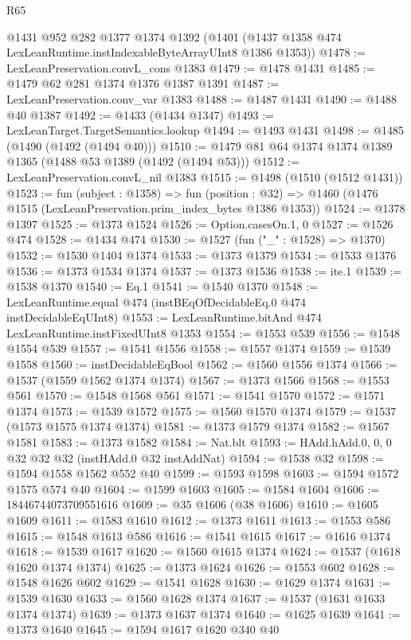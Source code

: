 \begin{lexlean}{R65}
\begin{coremodule}
    @1431
    @952
    @282
    @1377
    @1374
    @1392
    (@1401 (@1437 @1358 @474 LexLeanRuntime.instIndexableByteArrayUInt8 @1386 @1353))
@1478 := LexLeanPreservation.convL_cons @1383
@1479 := @1478 @1431
@1485 := @1479 @62 @281 @1374 @1376 @1387 @1391
@1487 := LexLeanPreservation.conv_var @1383
@1488 := @1487 @1431
@1490 := @1488 @40 @1387
@1492 := @1433 (@1434 @1347)
@1493 := LexLeanTarget.TargetSemantics.lookup
@1494 := @1493 @1431
@1498 := @1485 (@1490 (@1492 (@1494 @40)))
@1510 := @1479 @81 @64 @1374 @1374 @1389 @1365 (@1488 @53 @1389 (@1492 (@1494 @53)))
@1512 := LexLeanPreservation.convL_nil @1383
@1515 := @1498 (@1510 (@1512 @1431))
@1523 := fun (subject : @1358) =>
  fun (position : @32) => @1460 (@1476 @1515 (LexLeanPreservation.prim_index_bytes @1386 @1353))
@1524 := @1378 @1397
@1525 := @1373 @1524
@1526 := Option.casesOn.{1, 0}
@1527 := @1526 @474
@1528 := @1434 @474
@1530 := @1527 (fun ("_" : @1528) => @1370)
@1532 := @1530 @1404 @1374
@1533 := @1373 @1379
@1534 := @1533 @1376
@1536 := @1373 @1534 @1374
@1537 := @1373 @1536
@1538 := ite.{1}
@1539 := @1538 @1370
@1540 := Eq.{1}
@1541 := @1540 @1370
@1548 := LexLeanRuntime.equal @474 (instBEqOfDecidableEq.{0} @474 instDecidableEqUInt8)
@1553 := LexLeanRuntime.bitAnd @474 LexLeanRuntime.instFixedUInt8 @1353
@1554 := @1553 @539
@1556 := @1548 @1554 @539
@1557 := @1541 @1556
@1558 := @1557 @1374
@1559 := @1539 @1558
@1560 := instDecidableEqBool
@1562 := @1560 @1556 @1374
@1566 := @1537 (@1559 @1562 @1374 @1374)
@1567 := @1373 @1566
@1568 := @1553 @561
@1570 := @1548 @1568 @561
@1571 := @1541 @1570
@1572 := @1571 @1374
@1573 := @1539 @1572
@1575 := @1560 @1570 @1374
@1579 := @1537 (@1573 @1575 @1374 @1374)
@1581 := @1373 @1579 @1374
@1582 := @1567 @1581
@1583 := @1373 @1582
@1584 := Nat.blt
@1593 := HAdd.hAdd.{0, 0, 0} @32 @32 @32 (instHAdd.{0} @32 instAddNat)
@1594 := @1538 @32
@1598 := @1594 @1558 @1562 @552 @40
@1599 := @1593 @1598
@1603 := @1594 @1572 @1575 @574 @40
@1604 := @1599 @1603
@1605 := @1584 @1604
@1606 := 18446744073709551616
@1609 := @35 @1606 (@38 @1606)
@1610 := @1605 @1609
@1611 := @1583 @1610
@1612 := @1373 @1611
@1613 := @1553 @586
@1615 := @1548 @1613 @586
@1616 := @1541 @1615
@1617 := @1616 @1374
@1618 := @1539 @1617
@1620 := @1560 @1615 @1374
@1624 := @1537 (@1618 @1620 @1374 @1374)
@1625 := @1373 @1624
@1626 := @1553 @602
@1628 := @1548 @1626 @602
@1629 := @1541 @1628
@1630 := @1629 @1374
@1631 := @1539 @1630
@1633 := @1560 @1628 @1374
@1637 := @1537 (@1631 @1633 @1374 @1374)
@1639 := @1373 @1637 @1374
@1640 := @1625 @1639
@1641 := @1373 @1640
@1645 := @1594 @1617 @1620 @340 @40

\end{coremodule}
\end{lexlean}
